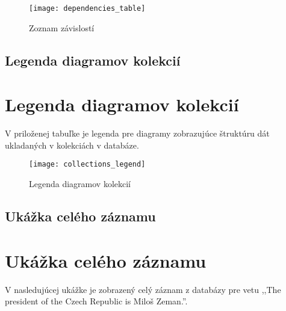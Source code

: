 \begin{figure}[H]
	\begin{center}\texttt{[image: dependencies\_table]}\end{center}
	\caption[Zoznam závislotí]{Zoznam závislostí}\label{fig:dependencies_table}
\end{figure}

\newpage
{}
{
	\section{Legenda diagramov kolekcií}
}
{
	\chapter{Legenda diagramov kolekcií}
}
V priloženej tabuľke je legenda pre diagramy zobrazujúce štruktúru dát ukladaných v kolekciách v databáze.

\begin{figure}[H]
	\begin{center}\texttt{[image: collections\_legend]}\end{center}
	\caption[Legenda diagramov kolekcií]{Legenda diagramov kolekcií}\label{fig:collections_legend}
\end{figure}

\newpage
{}
{
	\section{Ukážka celého záznamu}
}
{
	\chapter{Ukážka celého záznamu}
}
\label{appendix:db_entry_full_example}
V nasledujúcej ukážke je zobrazený celý záznam z databázy pre vetu ,,The president of the Czech Republic is Miloš Zeman.''. \\

